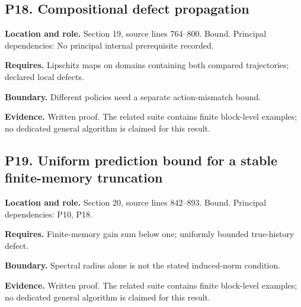 \documentclass[11pt,letterpaper]{article}
\begin{document}
\par\noindent\begin{minipage}{\textwidth}
\subsection{P18. Compositional defect
propagation}\label{p18.-compositional-defect-propagation}

\textbf{Location and role.} Section 19, source lines 764--800. Bound.
Principal dependencies: No principal internal prerequisite recorded.

\textbf{Requires.} Lipschitz maps on domains containing both compared
trajectories; declared local defects.

\textbf{Boundary.} Different policies need a separate action-mismatch
bound.

\textbf{Evidence.} Written proof. The related suite contains finite
block-level examples; no dedicated general algorithm is claimed for this
result.
\end{minipage}\par\medskip

\par\noindent\begin{minipage}{\textwidth}
\subsection{P19. Uniform prediction bound for a stable finite-memory
truncation}\label{p19.-uniform-prediction-bound-for-a-stable-finite-memory-truncation}

\textbf{Location and role.} Section 20, source lines 842--893. Bound.
Principal dependencies: P10, P18.

\textbf{Requires.} Finite-memory gain sum below one; uniformly bounded
true-history defect.

\textbf{Boundary.} Spectral radius alone is not the stated induced-norm
condition.

\textbf{Evidence.} Written proof. The related suite contains finite
block-level examples; no dedicated general algorithm is claimed for this
result.
\end{minipage}\par\medskip
\end{document}
